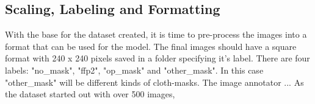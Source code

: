 \subsection{Scaling, Labeling and Formatting}

With the base for the dataset created, it is time to pre-process the images into
a format that can be used for the model. The final images should have a square
format with 240 x 240 pixels saved in a folder specifying it's label. There are
four labels: "no\_mask", "ffp2", "op\_mask" and "other\_mask". In this case
"other\_mask" will be different kinds of cloth-masks.
\newline
The image annotator
...
As the dataset started out with over 500 images, 
